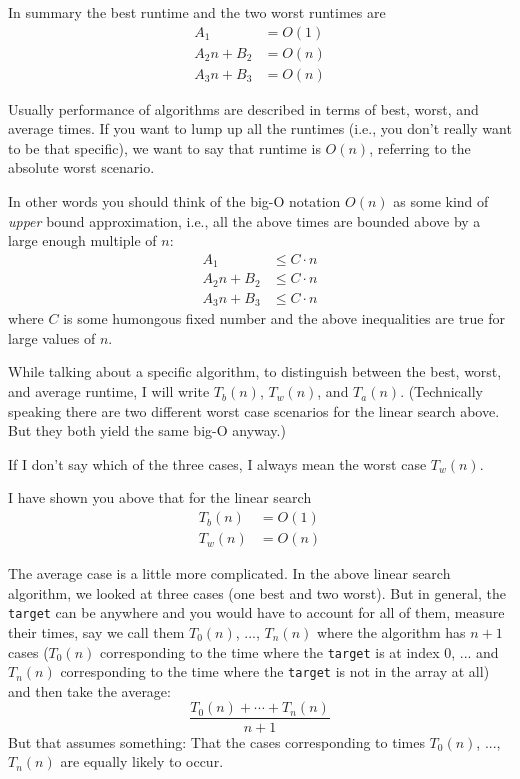 In summary the best runtime and the two worst runtimes are
\begin{align*}
A_1 &= O(1) \\
A_2n + B_2 &= O(n) \\
A_3n + B_3 &= O(n) 
\end{align*}

Usually performance of algorithms are described in terms of
best, worst, and average times.
If you want to lump up all the runtimes (i.e., you don't really want to
be that specific), we want to say that runtime is $O(n)$, 
referring to the absolute worst scenario.

In other words you should think of the big-O notation $O(n)$
as some kind of \textit{upper} bound approximation, i.e.,
all the above times are bounded above by a large enough multiple of $n$:
\begin{align*}
A_1        &\leq C \cdot n \\
A_2n + B_2 &\leq C \cdot n \\
A_3n + B_3 &\leq C \cdot n
\end{align*}
where $C$ is some humongous fixed number and the above inequalities
are true for large values of $n$.

While talking about a specific algorithm, to distinguish between
the best, worst, and average runtime, I will write
$T_{b}(n)$,
$T_{w}(n)$,
and
$T_{a}(n)$.
(Technically speaking there are two different worst case scenarios
for the linear search above.
But they both yield the same big-O anyway.)

If I don't say which of the three cases, I always mean the 
worst case $T_w(n)$.

I have shown you above that for the linear search
\begin{align*}
T_b(n) &= O(1) \\
T_w(n) &= O(n)
\end{align*}

The average case is a little more complicated.
In the above linear search algorithm, we looked at
three cases (one best and two worst).
But in general, the \verb!target! can be anywhere and you would have to 
account for all of them, measure their times, 
say we call them $T_0(n)$, ..., $T_n(n)$
where the algorithm has $n + 1$ cases
($T_0(n)$ corresponding to the time where the \verb!target! is at index 0, ...
and $T_n(n)$ corresponding to the time where the \verb!target! is not
in the array at all)
and then take the average:
\[
\frac{T_0(n) + \cdots + T_n(n)}{n + 1}
\]
But that assumes something: 
That the cases corresponding to times $T_0(n)$, ..., $T_n(n)$ are
equally likely to occur.

